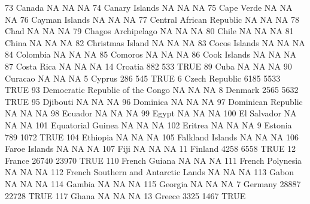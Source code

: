 \documentclass [a4paper] {article}
\begin{document}
\begin{Schunk}
\begin{Soutput}
73                               Canada    NA    NA   NA
74                       Canary Islands    NA    NA   NA
75                           Cape Verde    NA    NA   NA
76                       Cayman Islands    NA    NA   NA
77             Central African Republic    NA    NA   NA
78                                 Chad    NA    NA   NA
79                   Chagos Archipelago    NA    NA   NA
80                                Chile    NA    NA   NA
81                                China    NA    NA   NA
82                     Christmas Island    NA    NA   NA
83                        Cocos Islands    NA    NA   NA
84                             Colombia    NA    NA   NA
85                              Comoros    NA    NA   NA
86                         Cook Islands    NA    NA   NA
87                           Costa Rica    NA    NA   NA
14                              Croatia   882   533 TRUE
89                                 Cuba    NA    NA   NA
90                              Curacao    NA    NA   NA
5                                Cyprus   286   545 TRUE
6                        Czech Republic  6185  5533 TRUE
93     Democratic Republic of the Congo    NA    NA   NA
8                               Denmark  2565  5632 TRUE
95                             Djibouti    NA    NA   NA
96                             Dominica    NA    NA   NA
97                   Dominican Republic    NA    NA   NA
98                              Ecuador    NA    NA   NA
99                                Egypt    NA    NA   NA
100                         El Salvador    NA    NA   NA
101                   Equatorial Guinea    NA    NA   NA
102                             Eritrea    NA    NA   NA
9                               Estonia   789  1072 TRUE
104                            Ethiopia    NA    NA   NA
105                    Falkland Islands    NA    NA   NA
106                       Faroe Islands    NA    NA   NA
107                                Fiji    NA    NA   NA
11                              Finland  4258  6558 TRUE
12                               France 26740 23970 TRUE
110                       French Guiana    NA    NA   NA
111                    French Polynesia    NA    NA   NA
112 French Southern and Antarctic Lands    NA    NA   NA
113                               Gabon    NA    NA   NA
114                              Gambia    NA    NA   NA
115                             Georgia    NA    NA   NA
7                               Germany 28887 22728 TRUE
117                               Ghana    NA    NA   NA
13                               Greece  3325  1467 TRUE

\end{Soutput}
\end{Schunk}
\end{document}
